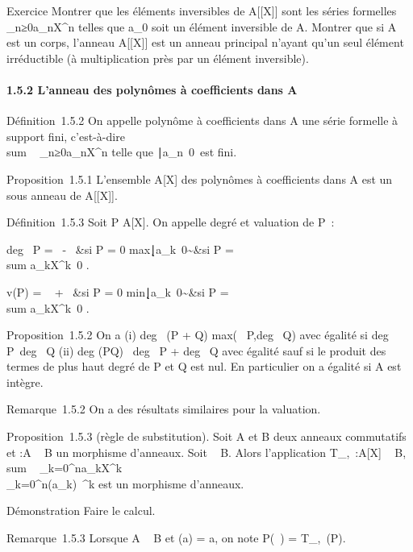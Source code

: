 \documentclass[]{article}
\begin{document}
Exercice Montrer que les éléments inversibles de A{[}{[}X{]}{]} sont les
séries formelles \\\sum
 \_n≥0a\_nX^n telles que a\_0 soit
un élément inversible de A. Montrer que si A est un corps, l'anneau
A{[}{[}X{]}{]} est un anneau principal n'ayant qu'un seul élément
irréductible (à multiplication près par un élément inversible).

\paragraph{1.5.2 L'anneau des polynômes à coefficients dans A}

Définition~1.5.2 On appelle polynôme à coefficients dans A une série
formelle à support fini, c'est-à-dire
\\sum ~
\_n≥0a\_nX^n telle que
\n∣a\_n\mathrel\neq~0\
est fini.

Proposition~1.5.1 L'ensemble A{[}X{]} des polynômes à coefficients dans
A est un sous anneau de A{[}{[}X{]}{]}.

Définition~1.5.3 Soit P \in A{[}X{]}. On appelle degré et valuation de P~:

deg~ P = \left
\ \cases -\infty~ &si P = 0
\cr
max\k∣a\_k\mathrel\neq~0\~&si
P = \\sum
a\_kX^k\neq~0 
\right .

v(P) = \left \ \cases
+\infty~ &si P = 0 \cr
min\k∣a\_k\mathrel\neq~0\~&si
P = \\sum
a\_kX^k\neq~0 
\right .

Proposition~1.5.2 On a (i) deg~ (P + Q)
\leq max(\deg~
P,deg~ Q) avec égalité si
deg~
P\neq~deg~ Q (ii)
deg (PQ) \leq\ deg~ P
+ deg~ Q avec égalité sauf si le produit des
termes de plus haut degré de P et Q est nul. En particulier on a égalité
si A est intègre.

Remarque~1.5.2 On a des résultats similaires pour la valuation.

Proposition~1.5.3 (règle de substitution). Soit A et B deux anneaux
commutatifs et \phi:A \rightarrow~ B un morphisme d'anneaux. Soit \beta~ \in B. Alors
l'application T\_\phi,\beta~:A{[}X{]} \rightarrow~ B,
\\sum ~
\_k=0^na\_kX^k\mapsto~\\\sum
 \_k=0^n\phi(a\_k)\beta~^k est un morphisme
d'anneaux.

Démonstration Faire le calcul.

Remarque~1.5.3 Lorsque A \subset~ B et \phi(a) = a, on note P(\beta~) =
T\_\phi,\beta~(P).
\end{document}

